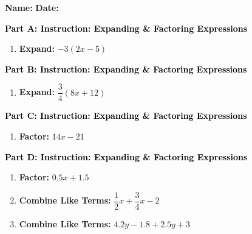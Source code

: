 \documentclass[12pt, letterpaper, fleqn]{article}
\begin{document}
\textbf{Name:} \underline{\hspace{5cm}}
\hfill
\textbf{Date:} \underline{\hspace{3cm}}\\

\begin{tcolorbox}[colback=customteal!20]
\large\textcolor{black}{\textbf{Part A: Instruction: Expanding \& Factoring Expressions}}
\end{tcolorbox}

\vspace{3mm}

\begin{enumerate}[itemsep=2.2cm, leftmargin=0.6cm]
\item \textbf{Expand:} $-3(2x - 5)$
\end{enumerate}

\newpage

\begin{tcolorbox}[colback=customteal!20]
\large\textcolor{black}{\textbf{Part B: Instruction: Expanding \& Factoring Expressions}}
\end{tcolorbox}

\vspace{3mm}

\begin{enumerate}[itemsep=2.2cm, leftmargin=0.6cm, resume]
\item \textbf{Expand:} $\dfrac{3}{4}\left(8x + 12\right)$
\end{enumerate}

\newpage

\begin{tcolorbox}[colback=customteal!20]
\large\textcolor{black}{\textbf{Part C: Instruction: Expanding \& Factoring Expressions}}
\end{tcolorbox}

\vspace{3mm}

\begin{enumerate}[itemsep=2.2cm, leftmargin=0.6cm, resume]
\item \textbf{Factor:} $14x - 21$
\end{enumerate}

\newpage

\begin{tcolorbox}[colback=customteal!20]
\large\textcolor{black}{\textbf{Part D: Instruction: Expanding \& Factoring Expressions}}
\end{tcolorbox}

\vspace{3mm}

\begin{enumerate}[itemsep=2.2cm, leftmargin=0.6cm, resume]
\item \textbf{Factor:} $0.5x + 1.5$
\item \textbf{Combine Like Terms:} $\dfrac{1}{2}x + \dfrac{3}{4}x - 2$
\item \textbf{Combine Like Terms:} $4.2y - 1.8 + 2.5y + 3$
\end{enumerate}
\end{document}
